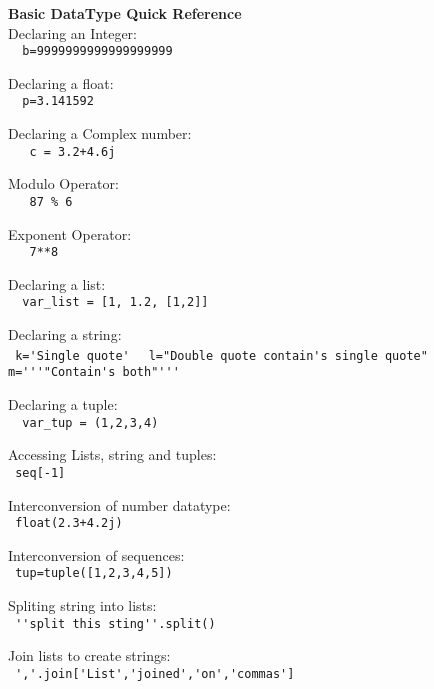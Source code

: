 \textbf{Basic DataType Quick Reference}\\

Declaring an Integer:\\
{\ex \lstinline|  b=9999999999999999999 |}

Declaring a float:\\
{\ex \lstinline|  p=3.141592 |}

Declaring a Complex number:\\
{\ex \lstinline|   c = 3.2+4.6j |}

Modulo Operator:\\
{\ex \lstinline|   87 % 6 |}

Exponent Operator:\\
{\ex \lstinline|   7**8 |}

Declaring a list:\\
{\ex \lstinline|  var_list = [1, 1.2, [1,2]] |}

Declaring a string:\\
{\ex \lstinline| k='Single quote' |}
{\ex \lstinline| l="Double quote contain's single quote" |}
{\ex \lstinline| m='''"Contain's both"''' |}

Declaring a tuple:\\
{\ex \lstinline|  var_tup = (1,2,3,4) |}


Accessing Lists, string and tuples:\\
{\ex \lstinline| seq[-1] |} 

Interconversion of number datatype:\\
{\ex \lstinline| float(2.3+4.2j) |}


Interconversion of sequences:\\
{\ex \lstinline| tup=tuple([1,2,3,4,5]) |}

Spliting string into lists:\\
{\ex \lstinline| ''split this sting''.split() |}

Join lists to create strings:\\
{\ex \lstinline| ','.join['List','joined','on','commas'] |}

